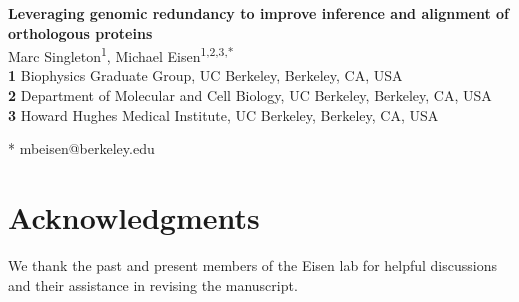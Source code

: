 \documentclass[11pt,letterpaper]{article}
\begin{document}
\graphicspath{{./figures/}}

\begin{flushleft}
{\Large\textbf{Leveraging genomic redundancy to improve inference and alignment of orthologous proteins}}
\newline
\\
Marc Singleton\textsuperscript{1},
Michael Eisen\textsuperscript{1,2,3,*}
\\
\bigskip
\textbf{1} Biophysics Graduate Group, UC Berkeley, Berkeley, CA, USA
\\
\textbf{2} Department of Molecular and Cell Biology, UC Berkeley, Berkeley, CA, USA
\\
\textbf{3} Howard Hughes Medical Institute, UC Berkeley, Berkeley, CA, USA
\\
\bigskip

* mbeisen@berkeley.edu

\end{flushleft}



\section*{Acknowledgments}
We thank the past and present members of the Eisen lab for helpful discussions and their assistance in revising the manuscript.

\printbibliography

\clearpage


\end{document}
